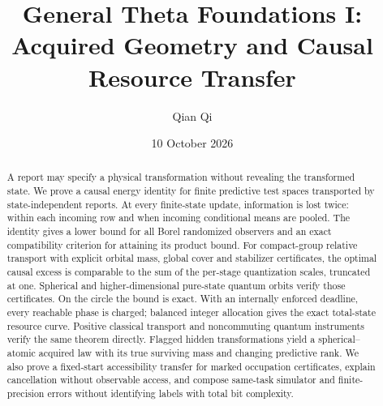 \documentclass[11pt]{amsart}
\title[General Theta Foundations I]{General Theta Foundations I:\\Acquired Geometry and Causal Resource Transfer}
\author{Qian Qi}\date{10 October 2026}
\theoremstyle{definition}\newtheorem{definition}[theorem]{Definition}
\theoremstyle{remark}\newtheorem{remark}[theorem]{Remark}
\begin{document}
\begin{abstract}
A report may specify a physical transformation without revealing the transformed state. We prove a causal energy identity for finite predictive test spaces transported by state-independent reports. At every finite-state update, information is lost twice: within each incoming row and when incoming conditional means are pooled. The identity gives a lower bound for all Borel randomized observers and an exact compatibility criterion for attaining its product bound. For compact-group relative transport with explicit orbital mass, global cover and stabilizer certificates, the optimal causal excess is comparable to the sum of the per-stage quantization scales, truncated at one. Spherical and higher-dimensional pure-state quantum orbits verify those certificates. On the circle the bound is exact. With an internally enforced deadline, every reachable phase is charged; balanced integer allocation gives the exact total-state resource curve. Positive classical transport and noncommuting quantum instruments verify the same theorem directly. Flagged hidden transformations yield a spherical--atomic acquired law with its true surviving mass and changing predictive rank. We also prove a fixed-start accessibility transfer for marked occupation certificates, explain cancellation without observable access, and compose same-task simulator and finite-precision errors without identifying labels with total bit complexity.
\end{abstract}
\maketitle










\clearpage

\end{document}
